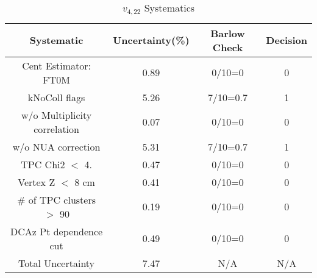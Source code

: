 \begin{table}[htbp]
\caption{$v_{4,22}$ Systematics}
\label{tab:Sys_v422}
\centering
\begin{tabular}{|c|c|c|c|}
\hline
Systematic & Uncertainty(\%) & Barlow Check & Decision \\
\hline
Cent Estimator: FT0M & 0.89 & 0/10=0 & 0 \\
kNoColl flags & 5.26 & 7/10=0.7 & 1 \\
w/o Multiplicity correlation & 0.07 & 0/10=0 & 0 \\
w/o NUA correction & 5.31 & 7/10=0.7 & 1 \\
TPC Chi2 $<$ 4. & 0.47 & 0/10=0 & 0 \\
Vertex Z $<$ 8 cm & 0.41 & 0/10=0 & 0 \\
\# of TPC clusters $>$ 90 & 0.19 & 0/10=0 & 0 \\
DCAz Pt dependence cut & 0.49 & 0/10=0 & 0 \\
\hline
Total Uncertainty & 7.47 & N/A & N/A \\
\hline
\end{tabular}
\end{table}

